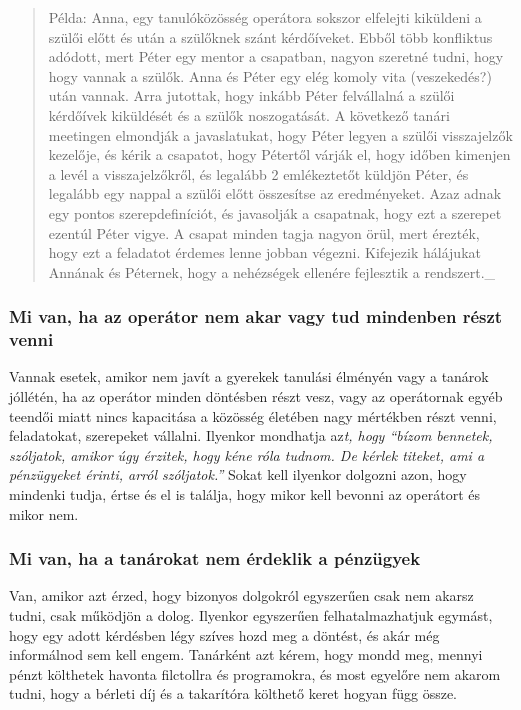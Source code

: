 \begin{quote}
Példa: Anna, egy tanulóközösség operátora sokszor elfelejti kiküldeni a
szülői előtt és után a szülőknek szánt kérdőíveket. Ebből több
konfliktus adódott, mert Péter egy mentor a csapatban, nagyon szeretné
tudni, hogy hogy vannak a szülők. Anna és Péter egy elég komoly vita
(veszekedés?) után vannak. Arra jutottak, hogy inkább Péter felvállalná
a szülői kérdőívek kiküldését és a szülők noszogatását. A következő
tanári meetingen elmondják a javaslatukat, hogy Péter legyen a szülői
visszajelzők kezelője, és kérik a csapatot, hogy Pétertől várják el,
hogy időben kimenjen a levél a visszajelzőkről, és legalább 2
emlékeztetőt küldjön Péter, és legalább egy nappal a szülői előtt
összesítse az eredményeket. Azaz adnak egy pontos szerepdefiníciót, és
javasolják a csapatnak, hogy ezt a szerepet ezentúl Péter vigye. A
csapat minden tagja nagyon örül, mert érezték, hogy ezt a feladatot
érdemes lenne jobban végezni. Kifejezik hálájukat Annának és Péternek,
hogy a nehézségek ellenére fejlesztik a rendszert.\_
\end{quote}

\hypertarget{mi-van-ha-az-operator-nem-akar-vagy-tud-mindenben-reszt-venni}{%
\subsubsection{Mi van, ha az operátor nem akar vagy tud mindenben részt
venni}\label{mi-van-ha-az-operator-nem-akar-vagy-tud-mindenben-reszt-venni}}

Vannak esetek, amikor nem javít a gyerekek tanulási élményén vagy a
tanárok jóllétén, ha az operátor minden döntésben részt vesz, vagy az
operátornak egyéb teendői miatt nincs kapacitása a közösség életében
nagy mértékben részt venni, feladatokat, szerepeket vállalni. Ilyenkor
mondhatja az\emph{t, hogy ``bízom bennetek, szóljatok, amikor úgy
érzitek, hogy kéne róla tudnom. De kérlek titeket, ami a pénzügyeket
érinti, arról szóljatok.''} Sokat kell ilyenkor dolgozni azon, hogy
mindenki tudja, értse és el is találja, hogy mikor kell bevonni az
operátort és mikor nem.

\hypertarget{mi-van-ha-a-tanarokat-nem-erdeklik-a-penzugyek}{%
\subsubsection{Mi van, ha a tanárokat nem érdeklik a
pénzügyek}\label{mi-van-ha-a-tanarokat-nem-erdeklik-a-penzugyek}}

Van, amikor azt érzed, hogy bizonyos dolgokról egyszerűen csak nem
akarsz tudni, csak működjön a dolog. Ilyenkor egyszerűen
felhatalmazhatjuk egymást, hogy egy adott kérdésben légy szíves hozd meg
a döntést, és akár még informálnod sem kell engem. Tanárként azt kérem,
hogy mondd meg, mennyi pénzt költhetek havonta filctollra és
programokra, és most egyelőre nem akarom tudni, hogy a bérleti díj és a
takarítóra költhető keret hogyan függ össze.

